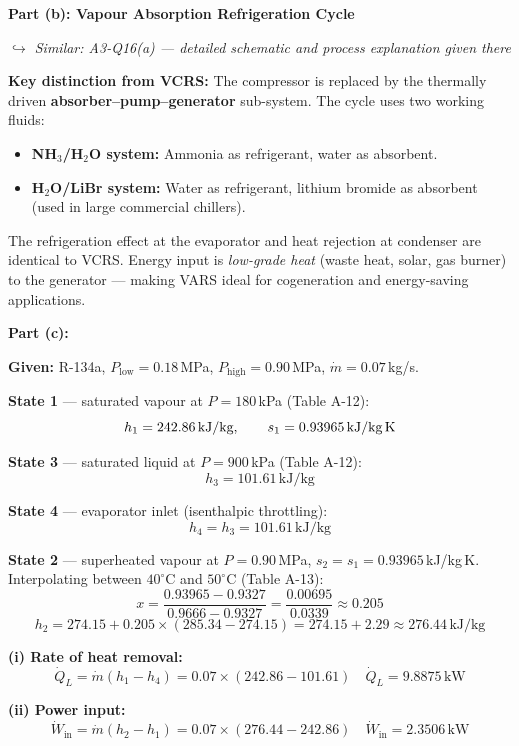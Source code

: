 \documentclass[12pt,a3paper]{article}
\newcommand{\variant}[1]{\par\vspace{1pt}\textcolor{blue!50!black}%
  {\footnotesize\textit{$\hookrightarrow$ Similar: #1}}}
\begin{document}
\begin{enumerate}
\begin{tcolorbox}[enhanced,breakable,ansbox,colback=cC!4,colframe=cC,
  boxrule=0.8pt,arc=5pt,
  title={\textbf{Solution}},fonttitle=\bfseries\color{white},colbacktitle=cC]
\textbf{Part (b): Vapour Absorption Refrigeration Cycle}

\variant{A3-Q16(a) — detailed schematic and process explanation given there}

\textbf{Key distinction from VCRS:} The compressor is replaced by the
thermally driven \textbf{absorber--pump--generator} sub-system. The cycle
uses two working fluids:
\begin{itemize}[leftmargin=1.5em,itemsep=1pt]
  \item \textbf{NH$_3$/H$_2$O system:} Ammonia as refrigerant, water as
        absorbent.
  \item \textbf{H$_2$O/LiBr system:} Water as refrigerant, lithium bromide
        as absorbent (used in large commercial chillers).
\end{itemize}

The refrigeration effect at the evaporator and heat rejection at condenser
are identical to VCRS. Energy input is \emph{low-grade heat} (waste heat,
solar, gas burner) to the generator — making VARS ideal for cogeneration
and energy-saving applications.


  \medskip
\textbf{Part (c):}
  
\textbf{Given:} R-134a,\;
$P_\text{low} = 0.18$\,MPa,\;
$P_\text{high} = 0.90$\,MPa,\;
$\dot{m} = 0.07$\,kg/s.

\medskip
\textbf{State 1} --- saturated vapour at $P = 180$\,kPa (Table A-12):
\[
  h_1 = 242.86\,\text{kJ/kg}, \qquad s_1 = 0.93965\,\text{kJ/kg\,K}
\]

\textbf{State 3} --- saturated liquid at $P = 900$\,kPa (Table A-12):
\[
  h_3 = 101.61\,\text{kJ/kg}
\]

\textbf{State 4} --- evaporator inlet (isenthalpic throttling):
\[
  h_4 = h_3 = 101.61\,\text{kJ/kg}
\]

\textbf{State 2} --- superheated vapour at $P = 0.90$\,MPa,
$s_2 = s_1 = 0.93965$\,kJ/kg\,K.
Interpolating between $40^\circ$C and $50^\circ$C (Table A-13):
\[
  x = \frac{0.93965 - 0.9327}{0.9666 - 0.9327}
    = \frac{0.00695}{0.0339} \approx 0.205
\]
\[
  h_2 = 274.15 + 0.205\times(285.34 - 274.15)
      = 274.15 + 2.29
      \approx 276.44\,\text{kJ/kg}
\]

\medskip
\textbf{(i) Rate of heat removal:}
\[
  \dot{Q}_L = \dot{m}(h_1 - h_4)
  = 0.07\times(242.86 - 101.61)
  \quad\boxed{\dot{Q}_L = 9.8875\,\text{kW}}
\]

\textbf{(ii) Power input:}
\[
  \dot{W}_\text{in} = \dot{m}(h_2 - h_1)
  = 0.07\times(276.44 - 242.86)
  \quad\boxed{\dot{W}_\text{in} = 2.3506\,\text{kW}}
\]


\end{tcolorbox}
\end{enumerate}
\end{document}
